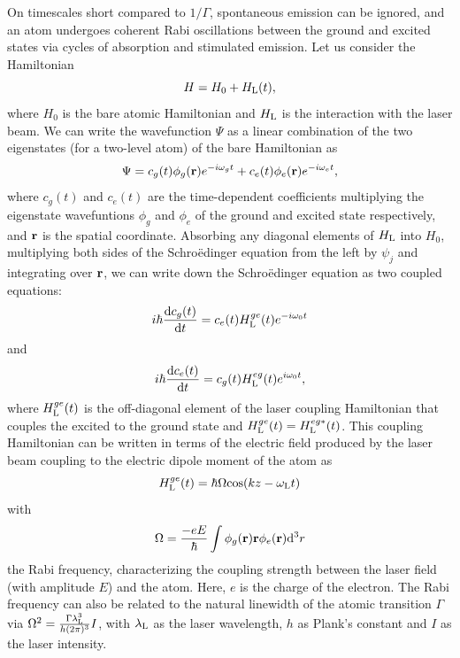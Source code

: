 On timescales short compared to $1/\Gamma$, spontaneous emission can be ignored, and an atom undergoes coherent Rabi oscillations between the ground and excited states via cycles of absorption and stimulated emission\cite{LCT}.  Let us consider the Hamiltonian 
\begin{equation}
H=H_0 + H_{\rm L}(t),
\end{equation}
where $H_0$ is the bare atomic Hamiltonian and $H_{\rm L}$ is the interaction with the laser beam. We can write the wavefunction $\Psi$ as a linear combination of the two eigenstates (for a two-level atom) of the bare Hamiltonian as 
\begin{equation}
\Psi = c_g(t)\phi_g ({\bf r})e^{-i\omega_g t} + c_e(t)\phi_e ({\bf r})e^{-i\omega_e t},
\end{equation}
where $c_g(t)$ and $c_e(t)$ are the time-dependent coefficients multiplying the eigenstate wavefuntions $\phi_g$ and $\phi_e$ of the ground and excited state respectively, and ${\bf r}$ is the spatial coordinate. Absorbing any diagonal elements of $H_{\rm L}$ into $H_0$, multiplying both sides of the Schro\"edinger equation from the left by $\psi_j$ and integrating over ${\bf r}$, we can write down the Schro\"edinger equation as two coupled equations:
\begin{equation}
i\hbar\frac{{\rm d}c_g(t)}{{\rm d}t} = c_e(t) H_{\rm L}^{ge}(t)e^{-i\omega_0t}
\end{equation}
and 
\begin{equation}
i\hbar\frac{{\rm d}c_e(t)}{{\rm d}t} = c_g(t) H_{\rm L}^{eg}(t)e^{i\omega_0t},
\end{equation}
where $ H_{\rm L}^{ge}(t)$ is the off-diagonal element of the laser coupling Hamiltonian that couples the excited to the ground state and  $H_{\rm L}^{ge}(t)= H_{\rm L}^{eg*}(t)$. This coupling Hamiltonian can be written in terms of the electric field produced by the laser beam coupling to the electric dipole moment of the atom as
\begin{equation}
 H_{\rm L}^{ge}(t) = \hbar \Omega {\rm cos}(kz - \omega_{\rm L} t)
\end{equation}
with
\begin{equation}
\Omega = \frac{-eE}{\hbar}\int \phi_g({\bf r}) {\bf r} \phi_e ({\bf r}) {\rm d}^3 r
\end{equation}
the Rabi frequency, characterizing the coupling strength between the laser field (with amplitude $E$) and the atom. Here, $e$ is the charge of the electron. The Rabi frequency can also be related to the natural linewidth of the atomic transition $\Gamma$ via $\Omega^2 = \frac{\Gamma\lambda_{\rm L}^3}{h(2\pi)^3}I$, with $\lambda_{\rm L}$ as the laser wavelength, $h$ as Plank's constant and $I$ as the laser intensity.

